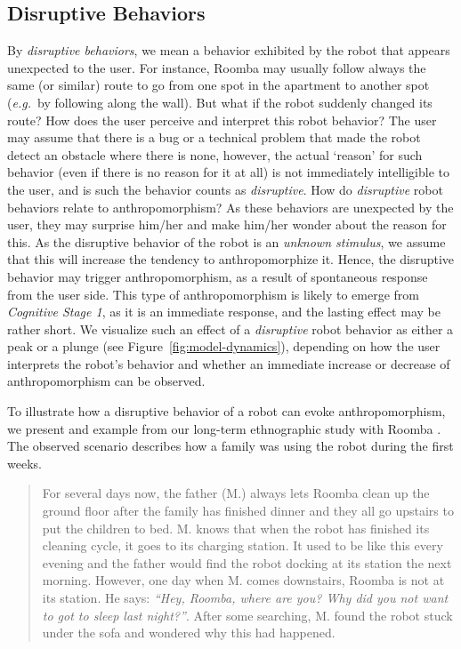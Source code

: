 \documentclass{frontiersSCNS} %
\newcommand{\eg}{{\textit{e.g.~}}}
\begin{document}
\subsection{Disruptive Behaviors}

By \textit{disruptive behaviors}, we mean a behavior exhibited by the robot that appears unexpected to the user. For instance, Roomba may usually follow always the same (or similar) route to go from one spot in the apartment to another spot (\eg by following along the wall). But what if the robot suddenly changed its route? How does the user perceive and interpret this robot behavior? The user may assume that there is a bug or a technical problem that made the robot detect an obstacle where there is none, however, the actual `reason' for such behavior (even if there is no reason for it at all) is not immediately intelligible to the user, and is such the behavior counts as \textit{disruptive}. How do \textit{disruptive} robot behaviors relate to anthropomorphism?
As these behaviors are unexpected by the user, they may surprise him/her and make him/her wonder about the reason for this. As the disruptive behavior of the robot is an \textit{unknown stimulus}, we assume that this will increase the tendency to anthropomorphize it. Hence, the disruptive behavior may trigger anthropomorphism, as a result of spontaneous response from the user side. This type of anthropomorphism is likely to emerge from \textit{Cognitive Stage 1}, as it is an immediate response, and the lasting effect may be rather short.
We visualize such an effect of a \textit{disruptive} robot behavior as either a peak or a plunge (see Figure~\ref{fig:model-dynamics}), depending on how the user interprets the robot's behavior and whether an immediate increase or decrease of anthropomorphism can be observed.

To illustrate how a disruptive behavior of a robot can evoke anthropomorphism, we present and example from our long-term ethnographic study with Roomba \citep{fink_living_2013}. The observed scenario describes how a family was using the robot during the first weeks. 

\begin{quote}
For several days now, the father (M.) always lets Roomba clean up the ground floor after the family has finished dinner and they all go upstairs to put the children to bed. M. knows that when the robot has finished its cleaning cycle, it goes to its charging station. It used to be like this every evening and the father would find the robot docking at its station the next morning. However, one day when M. comes downstairs, Roomba is not at its station. He says: \emph{``Hey, Roomba, where are you? Why did you not want to got to sleep last night?''}. After some searching, M. found the robot stuck under the sofa and wondered why this had happened. 
\end{quote}
\end{document}
